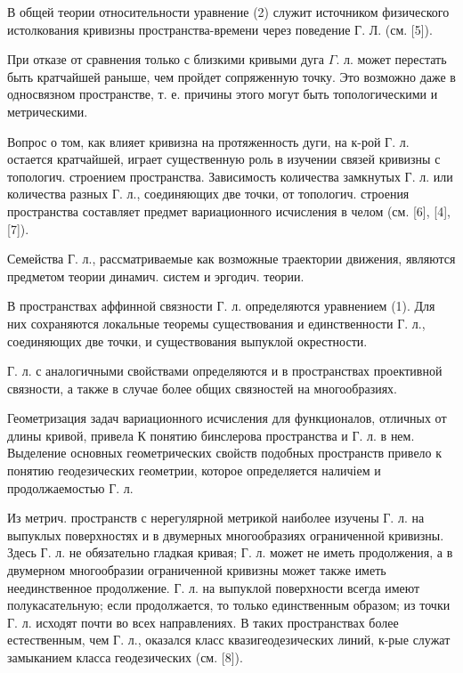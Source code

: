 \documentclass[10pt]{article}
\begin{document}
В общей теории относительности уравнение (2) служит источником физического истолкования кривизны пространства-времени через поведение Г. Л. (см. [5]).



При отказе от сравнения только с близкими кривыми дуга $\Gamma$. л. может перестать быть кратчайшей раныше, чем пройдет сопряженную точку. Это возможно даже в односвязном пространстве, т. е. причины этого могут быть топологическими и метрическими.



Вопрос о том, как влияет кривизна на протяженность дуги, на к-рой Г. л. остается кратчайшей, играет существенную роль в изучении связей кривизны с топологич. строением пространства. Зависимость количества замкнутых Г. л. или количества разных Г. л., соединяющих две точки, от топологич. строения пространства составляет предмет вариационного исчисления в челом (см. [6], [4], [7]).



Семейства Г. л., рассматриваемые как возможные траектории движения, являются предметом теории динамич. систем и эргодич. теории.



В пространствах аффинной связности Г. л. определяются уравнением (1). Для них сохраняются локальные теоремы существования и единственности Г. л., соединяющих две точки, и существования выпуклой окрестности.



Г. л. с аналогичными свойствами определяются и в пространствах проективной связности, а также в случае более общих связностей на многообразиях.



Геометризация задач вариационного исчисления для функционалов, отличных от длины кривой, привела К понятию бинслерова пространства и Г. л. в нем. Выделение основных геометрических свойств подобных пространств привело к понятию геодезических геометрии, которое определяется наличіем и продолжаемостью Г. л.



Из метрич. пространств с нерегулярной метрикой наиболее изучены $Г$. л. на выпуклых поверхностях и в двумерных многообразиях ограниченной кривизны. Здесь Г. л. не обязательно гладкая кривая; Г. л. может не иметь продолжения, а в двумерном многообразии ограниченной кривизны может также иметь неединственное продолжение. Г. л. на выпуклой поверхности всегда имеют полукасательную; если продолжается, то только единственным образом; из точки Г. л. исходят почти во всех направлениях. В таких пространствах более естественным, чем Г. л., оказался класс квазигеодезических линий, к-рые служат замыканием класса геодезических (см. [8]).
\end{document}
